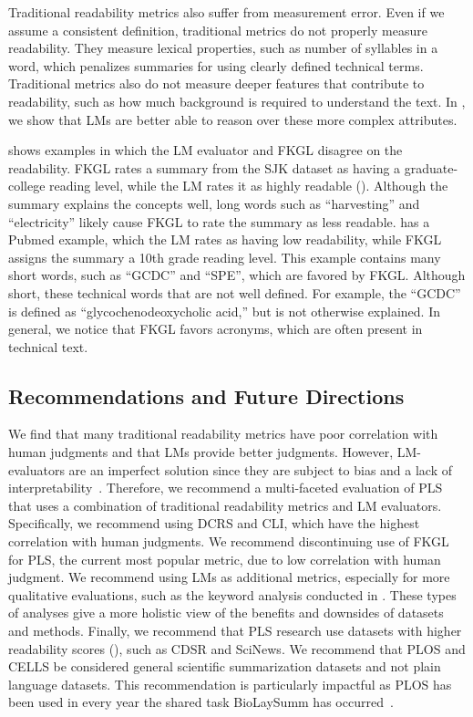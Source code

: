 Traditional readability metrics also suffer from measurement error. Even if we assume a consistent definition, traditional metrics do not properly measure readability. They measure lexical properties, such as number of syllables in a word, which penalizes summaries for using clearly defined technical terms. Traditional metrics also do not measure deeper features that contribute to readability, such as how much background is required to understand the text. In , we show that LMs are better able to reason over these more complex attributes. 

 shows examples in which the LM evaluator and FKGL disagree on the readability. FKGL rates a summary from the SJK dataset as having a graduate-college reading level, while the LM rates it as highly readable (). Although the summary explains the concepts well, long words such as ``harvesting'' and ``electricity'' likely cause FKGL to rate the summary as less readable.  has a Pubmed example, which the LM rates as having low readability, while FKGL assigns the summary a 10th grade reading level. This example contains many short words, such as ``GCDC'' and ``SPE'', which are favored by FKGL. Although short, these technical words that are not well defined. For example, the  ``GCDC'' is defined as ``glycochenodeoxycholic acid,'' but  is not otherwise explained. In general, we  notice that FKGL favors acronyms, which are often present in technical text.

\subsection{Recommendations and Future Directions}\label{subsec:recommendations}
We find that many traditional readability metrics have poor correlation with human judgments and that LMs provide better judgments. However, LM-evaluators are an imperfect solution since they are subject to bias and a lack of interpretability~\cite{Liu2023LLMsAN, Wang2023LargeLM, Shen2023LargeLM, Stureborg2024LargeLM}. Therefore, we recommend a multi-faceted evaluation of PLS that uses a combination of traditional readability metrics and LM evaluators. Specifically, we recommend using DCRS and CLI, which have the highest correlation with human judgments. We recommend discontinuing use of FKGL for PLS, the current most popular metric, due to low correlation with human judgment. We recommend using LMs as additional metrics, especially for more qualitative evaluations, such as the keyword analysis conducted in . These types of analyses give a more holistic view of the benefits and downsides of datasets and methods. Finally, we recommend that PLS research use datasets with higher readability scores (), such as CDSR and SciNews. We recommend that PLOS and CELLS be considered general scientific summarization datasets and not plain language datasets. This recommendation is particularly impactful as PLOS has been used in every year the shared task BioLaySumm has occurred~\cite{goldsack-etal-2024-biolaysumm,biolaysumm-2023-overview}.

